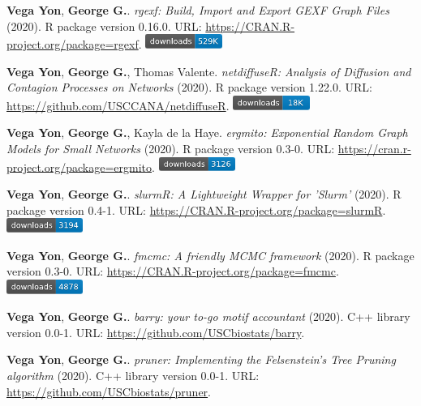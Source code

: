 \item {\bfseries Vega Yon}, {\bfseries George G.}. \textit{rgexf: Build, Import and Export GEXF Graph Files} (2020). R package version 0.16.0. {\small URL}: \url{https://CRAN.R-project.org/package=rgexf}. \includegraphics[width=2.5cm]{fig/cran-downloads-rgexf.pdf} 
\item {\bfseries Vega Yon}, {\bfseries George G.}, Thomas Valente. \textit{{{netdiffuseR: Analysis of Diffusion and Contagion Processes on Networks}}} (2020). R package version 1.22.0. {\small URL}: \url{https://github.com/USCCANA/netdiffuseR}. \includegraphics[width=2.5cm]{fig/cran-downloads-netdiffuser.pdf} 
\item {\bfseries Vega Yon}, {\bfseries George G.}, Kayla de la Haye. \textit{ergmito: Exponential Random Graph Models for Small Networks} (2020). R package version 0.3-0. {\small URL}: \url{https://cran.r-project.org/package=ergmito}. \includegraphics[width=2.5cm]{fig/cran-downloads-ergmito.pdf} 
\item {\bfseries Vega Yon}, {\bfseries George G.}. \textit{slurmR: A Lightweight Wrapper for 'Slurm'} (2020). R package version 0.4-1. {\small URL}: \url{https://CRAN.R-project.org/package=slurmR}. \includegraphics[width=2.5cm]{fig/cran-downloads-slurmr.pdf} 
\item {\bfseries Vega Yon}, {\bfseries George G.}. \textit{fmcmc: A friendly MCMC framework} (2020). R package version 0.3-0. {\small URL}: \url{https://CRAN.R-project.org/package=fmcmc}. \includegraphics[width=2.5cm]{fig/cran-downloads-fmcmc.pdf} 
\item {\bfseries Vega Yon}, {\bfseries George G.}. \textit{barry: your to-go motif accountant} (2020). C++ library version 0.0-1. {\small URL}: \url{https://github.com/USCbiostats/barry}.  
\item {\bfseries Vega Yon}, {\bfseries George G.}. \textit{pruner: Implementing the Felsenstein's Tree Pruning algorithm} (2020). C++ library version 0.0-1. {\small URL}: \url{https://github.com/USCbiostats/pruner}.  
